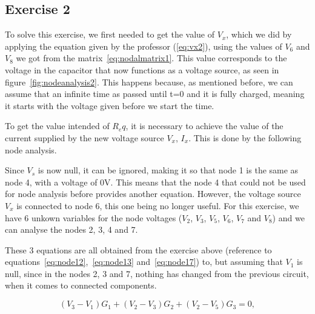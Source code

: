 



\subsection{Exercise 2}
\label{sec:exercise2}

To solve this exercise, we first needed to get the value of $V_x$, which we did by applying the equation given by the professor (\ref{eq:vx2}), using the values of $V_6$ and $V_8$ we got from the matrix~\ref{eq:nodalmatrix1}. This value corresponds to the voltage in the capacitor that now functions as a voltage source, as seen in figure~\ref{fig:nodeanalysis2}. This happens because, as mentioned before, we can assume that an infinite time as passed until t=0 and it is fully charged, meaning it starts with the voltage given before we start the time.

To get the value intended of $R_eq$, it is necessary to achieve the value of the current supplied by the new voltage source $V_x$, $I_x$. This is done by the following node analysis.

Since $V_s$ is now null, it can be ignored, making it so that node 1 is the same as node 4, with a voltage of 0V. This means that the node 4 that could not be used for node analysis before provides another equation. However, the voltage source $V_x$ is connected to node 6, this one being no longer useful. For this exercise, we have 6 unkown variables for the node voltages ($V_2$, $V_3$, $V_5$, $V_6$, $V_7$ and $V_8$) and we can analyse the nodes 2, 3, 4 and 7.

These 3 equations are all obtained from the exercise above (reference to equations~\ref{eq:node12},~\ref{eq:node13} and~\ref{eq:node17}) to, but assuming that $V_1$ is null, since in the nodes 2, 3 and 7, nothing has changed from the previous circuit, when it comes to connected components.

\begin{equation}
  (V_{3} - V_{1})G_{1} + (V_{2} - V_{3})G_{2} + (V_{2} - V_{5})G_{3}= 0,
  \label{eq:node22}
\end{equation}


